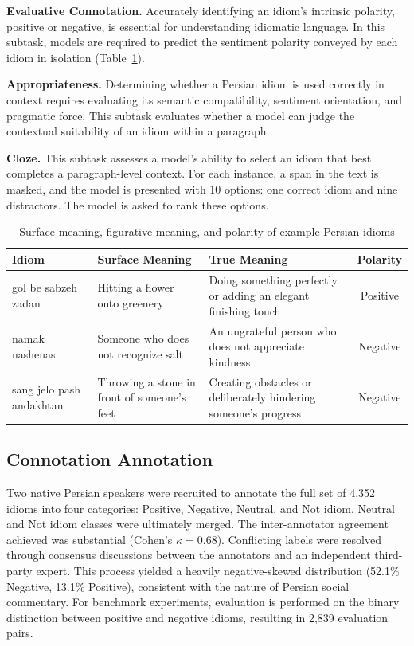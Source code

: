 \documentclass[11pt,a4paper]{article}
\begin{document}
\textbf{Evaluative Connotation.} Accurately identifying an idiom’s intrinsic polarity, positive or negative, is essential for understanding idiomatic language. In this subtask, models are required to predict the sentiment polarity conveyed by each idiom in isolation (Table~\ref{tab:idiom_examples}).

\textbf{Appropriateness.} Determining whether a Persian idiom is used correctly in context requires evaluating its semantic compatibility, sentiment orientation, and pragmatic force. This subtask evaluates whether a model can judge the contextual suitability of an idiom within a paragraph.

\textbf{Cloze.} This subtask assesses a model’s ability to select an idiom that best completes a paragraph-level context. For each instance, a span in the text is masked, and the model is presented with 10 options: one correct idiom and nine distractors. The model is asked to rank these options.

\begin{table}[t]
\centering
\caption{Surface meaning, figurative meaning, and polarity of example Persian idioms}
\label{tab:idiom_examples}
\begin{tabular}{p{3cm}p{3.2cm}p{5.2cm}c}
\toprule
\textbf{Idiom} & \textbf{Surface Meaning} & \textbf{True Meaning} & \textbf{Polarity} \\
\midrule
gol be sabzeh zadan & Hitting a flower onto greenery & Doing something perfectly or adding an elegant finishing touch & Positive \\
\addlinespace
namak nashenas & Someone who does not recognize salt & An ungrateful person who does not appreciate kindness & Negative \\
\addlinespace
sang jelo pash andakhtan & Throwing a stone in front of someone’s feet & Creating obstacles or deliberately hindering someone’s progress & Negative \\
\bottomrule
\end{tabular}
\end{table}

\subsection{Connotation Annotation}
Two native Persian speakers were recruited to annotate the full set of 4,352 idioms into four categories: Positive, Negative, Neutral, and Not idiom. Neutral and Not idiom classes were ultimately merged. The inter-annotator agreement achieved was substantial (Cohen's $\kappa = 0.68$). Conflicting labels were resolved through consensus discussions between the annotators and an independent third-party expert. This process yielded a heavily negative-skewed distribution (52.1\% Negative, 13.1\% Positive), consistent with the nature of Persian social commentary. For benchmark experiments, evaluation is performed on the binary distinction between positive and negative idioms, resulting in 2,839 evaluation pairs.
\end{document}
